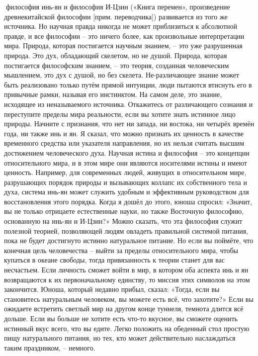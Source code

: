 \documentclass[a4paper]{book}
\begin{document}
философия инь-ян и философия И-Цзин («Книга перемен», произведение древнекитайской
философии [прим. переводчика]) развивается из того же источника. Но научная правда
никогда не может приблизиться к абсолютной правде, и все философии – это ничего более,
как произвольные интерпретации мира. Природа, которая постигается научным знанием, –
это уже разрушенная природа. Это дух, обладающий скелетом, но не душой. Природа,
которая постигается философским знанием, – это теория, созданная человеческим
мышлением, это дух с душой, но без скелета.
Не-различающее знание может быть реализовано только путём прямой интуиции, люди
пытаются втиснуть его в привычные рамки, называя его инстинктом. На самом деле, это
знание, исходящее из неназываемого источника. Откажитесь от различающего сознания и
переступите пределы мира реальности, если вы хотите знать истинное лицо природы.
Начните с признания, что нет ни запада, ни востока, ни четырёх времён года, ни также инь и
ян.
Я сказал, что можно признать их ценность в качестве временного средства или
указателя направления, но их нельзя считать высшим достижением человеческого духа.
Научная истина и философия – это концепции относительного мира, и в этом мире они
являются носителями истины и имеют ценность. Например, для современных людей,
живущих в относительном мире, разрушающих порядок природы и вызывающих коллапс их
собственного тела и духа, система инь-ян может служить удобным и эффективным
руководством для восстановления этого порядка.
Когда я дошёл до этого, юноша спросил: «Значит, вы не только отрицаете естественные
науки, но также Восточную философию, основанную на инь-ян и И-Цзин?»
Можно сказать, что эта философия служит полезной теорией, позволяющей людям
овладеть правильной системой питания, пока не будет достигнуто истинно натуральное
питание. Но если вы поймёте, что конечная цель человечества – выйти за пределы
относительного мира, чтобы купаться в океане свободы, тогда привязанность к теории
станет для вас несчастьем. Если личность сможет войти в мир, в котором оба аспекта инь и
ян возвращаются к их первоначальному единству, то миссия этих символов на этом
закончится.
Юноша, который недавно прибыл, сказал: «Тогда, если вы становитесь натуральным
человеком, вы можете есть всё, что захотите?»
Если вы ожидаете встретить светлый мир на другом конце туннеля, темнота длится всё
дольше. Если вы больше не хотите есть что-то вкусное, вы сможете оценить истинный вкус
всего, что вы едите. Легко положить на обеденный стол простую пищу натурального
питания, но тех, кто может действительно наслаждаться таким праздником, – немного.
\end{document}
